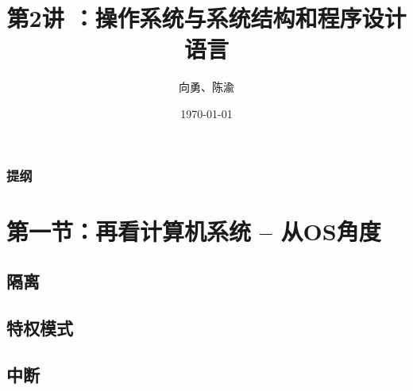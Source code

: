 \documentclass[UTF8]{ctexbeamer}
\title[第1讲]{第2讲 ：操作系统与系统结构和程序设计语言} %
\author{向勇、陈渝} %
\institute[清华大学] %
{
清华大学计算机系 \\ %
\medskip
\textit{xyong,yuchen@tsinghua.edu.cn} %
}
\date{\today} %
\begin{document}
\begin{frame}
\titlepage %
\end{frame}

\begin{frame}
\frametitle{提纲} %
\tableofcontents %
\end{frame}


\section{第一节：再看计算机系统 -- 从OS角度 } %

\subsection{隔离} %
\subsection{特权模式}
\subsection{中断}
\end{document}
